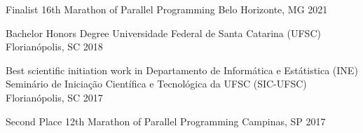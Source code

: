 


\begin{cvhonors}

  \cvhonor
    {Finalist} %
    {16th Marathon of Parallel Programming} %
    {Belo Horizonte, MG} %
    {2021} %

  \cvhonor
    {Bachelor Honors Degree} %
    {Universidade Federal de Santa Catarina (UFSC)} %
    {Florianópolis, SC} %
    {2018} %

  \cvhonor
    {Best scientific initiation work in Departamento de Informática e Estátistica (INE)} %
    {Seminário de Iniciação Científica e Tecnológica da UFSC (SIC-UFSC)} %
    {Florianópolis, SC} %
    {2017} %


  \cvhonor
    {Second Place} %
    {12th Marathon of Parallel Programming} %
    {Campinas, SP} %
    {2017} %


\end{cvhonors}
